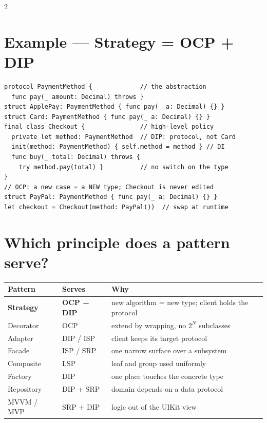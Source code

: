 \documentclass[8pt]{extarticle}
\begin{document}
\begin{multicols}{2}
\section{Example — Strategy = OCP + DIP}
\begin{lstlisting}[language=SwiftSheet]
protocol PaymentMethod {             // the abstraction
  func pay(_ amount: Decimal) throws }
struct ApplePay: PaymentMethod { func pay(_ a: Decimal) {} }
struct Card: PaymentMethod { func pay(_ a: Decimal) {} }
final class Checkout {               // high-level policy
  private let method: PaymentMethod  // DIP: protocol, not Card
  init(method: PaymentMethod) { self.method = method } // DI
  func buy(_ total: Decimal) throws {
    try method.pay(total) }          // no switch on the type
}
// OCP: a new case = a NEW type; Checkout is never edited
struct PayPal: PaymentMethod { func pay(_ a: Decimal) {} }
let checkout = Checkout(method: PayPal())  // swap at runtime
\end{lstlisting}

\columnbreak

\section{Which principle does a pattern serve?}
{\footnotesize
\begin{tabular}{@{}>{\raggedright\arraybackslash}p{16mm}>{\raggedright\arraybackslash}p{13mm}>{\raggedright\arraybackslash}p{46mm}@{}}
\toprule
\textbf{Pattern} & \textbf{Serves} & \textbf{Why} \\
\midrule
\textbf{Strategy} & \textbf{OCP + DIP} & new algorithm = new type; client holds the protocol \\
Decorator & OCP & extend by wrapping, no $2^N$ subclasses \\
Adapter & DIP / ISP & client keeps its target protocol \\
Facade & ISP / SRP & one narrow surface over a subsystem \\
Composite & LSP & leaf and group used uniformly \\
Factory & DIP & one place touches the concrete type \\
Repository & DIP + SRP & domain depends on a data protocol \\
MVVM / MVP & SRP + DIP & logic out of the UIKit view \\
\bottomrule
\end{tabular}}


\end{multicols}
\end{document}
